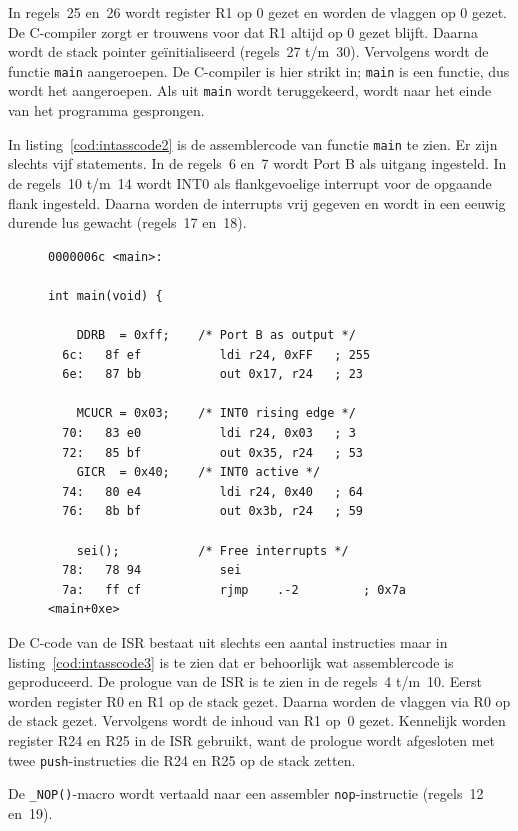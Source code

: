 In regels~25 en~26 wordt register R1 op 0 gezet en worden de vlaggen op 0
gezet. De C-compiler zorgt er trouwens voor dat R1 altijd op 0 gezet blijft.
Daarna wordt de stack pointer ge\"initialiseerd (regels~27 t/m~30). Vervolgens
wordt de functie \lstinline|main| aangeroepen. De C-compiler is hier strikt
in; \lstinline|main| is een functie, dus wordt het aangeroepen. Als uit
\lstinline|main| wordt teruggekeerd, wordt naar het einde van het programma
gesprongen.

In listing~\ref{cod:intasscode2} is de assemblercode van functie
\lstinline|main| te zien. Er zijn slechts vijf statements. In de regels~6
en~7 wordt Port B als uitgang ingesteld. In de regels~10 t/m~14 wordt
INT0 als flankgevoelige interrupt voor de opgaande flank ingesteld.
Daarna worden de interrupts vrij gegeven en wordt in een eeuwig durende
lus gewacht (regels~17 en~18).

\begin{figure}[!ht]
\begin{lstlisting}[language=AVRassembler,caption=De functie \lstinline|main|.,label=cod:intasscode2]
0000006c <main>:

int main(void) {
	
	DDRB  = 0xff;    /* Port B as output */
  6c:	8f ef       	ldi	r24, 0xFF	; 255
  6e:	87 bb       	out	0x17, r24	; 23
	
	MCUCR = 0x03;    /* INT0 rising edge */
  70:	83 e0       	ldi	r24, 0x03	; 3
  72:	85 bf       	out	0x35, r24	; 53
	GICR  = 0x40;    /* INT0 active */
  74:	80 e4       	ldi	r24, 0x40	; 64
  76:	8b bf       	out	0x3b, r24	; 59
	
	sei();           /* Free interrupts */
  78:	78 94       	sei
  7a:	ff cf       	rjmp	.-2      	; 0x7a <main+0xe>
\end{lstlisting}
\end{figure}

De C-code van de ISR bestaat uit slechts een aantal instructies maar in
listing~\ref{cod:intasscode3} is te zien dat er behoorlijk wat assemblercode
is geproduceerd. De prologue van de ISR is te zien in de regels~4 t/m~10.
Eerst worden register R0 en R1 op de stack gezet. Daarna worden de vlaggen
via R0 op de stack gezet. Vervolgens wordt de inhoud van R1 op~0 gezet.
Kennelijk worden register R24 en R25 in de ISR gebruikt, want de prologue
wordt afgesloten met twee \lstinline|push|-instructies die R24 en R25 op
de stack zetten.

De \lstinline|_NOP()|-macro wordt vertaald naar een assembler
\lstinline|nop|-instructie (regels~12 en~19).

